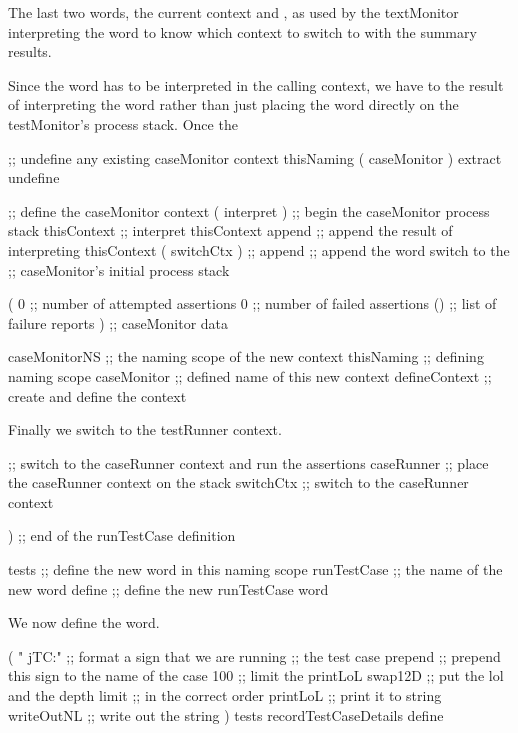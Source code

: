 The last two words, the current context and , as used by the 
textMonitor interpreting the  word to know which context to 
switch to with the summary results. 

Since the  word has to be interpreted in the calling 
context, we have to  the result of interpreting the 
 word rather than just placing the  
word directly on the testMonitor's process stack. Once the 

\startJoylolCode
  ;; undefine any existing caseMonitor context
  thisNaming
  ( caseMonitor ) extract
  undefine

  ;; define the caseMonitor context
  ( interpret ) ;; begin the caseMonitor process stack
  thisContext   ;; interpret thisContext 
  append        ;; append the result of interpreting thisContext
  ( switchCtx ) ;; 
  append        ;; append the word switch to the
                ;; caseMonitor's initial process stack
  
  ( 
    0           ;; number of attempted assertions
    0           ;; number of failed assertions
    ()          ;; list of failure reports
  )             ;; caseMonitor data

  caseMonitorNS ;; the naming scope of the new context
  thisNaming    ;; defining naming scope
  caseMonitor   ;; defined name of this new context
  defineContext ;; create and define the context
\stopJoylolCode

Finally we switch to the testRunner context.

\startJoylolCode
  ;; switch to the caseRunner context and run the assertions
  caseRunner ;; place the caseRunner context on the stack
  switchCtx  ;; switch to the caseRunner context
  
)            ;; end of the runTestCase definition

tests        ;; define the new word in this naming scope
runTestCase  ;; the name of the new word
define       ;; define the new runTestCase word
\stopJoylolCode

We now define the  word.

\startJoylolCode
(
  "  jTC:"    ;; format a sign that we are running
              ;; the test case
  prepend     ;; prepend this sign to the name of the case
  100         ;; limit the printLoL
  swap12D     ;; put the lol and the depth limit
              ;; in the correct order
  printLoL    ;; print it to string
  writeOutNL  ;; write out the string
)
tests
recordTestCaseDetails
define
\stopJoylolCode
\stopTestSuite

